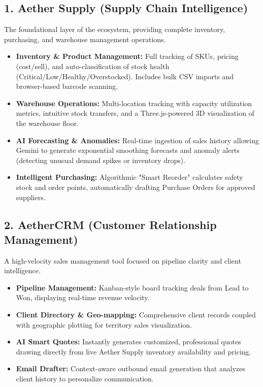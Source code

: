\documentclass[12pt,a4paper]{article}
\begin{document}
\subsection{1. Aether Supply (Supply Chain Intelligence)}
The foundational layer of the ecosystem, providing complete inventory, purchasing, and warehouse management operations.
\begin{itemize}[label=\textcolor{AetherLavender}{\textbullet}]
    \item \textbf{Inventory & Product Management:} Full tracking of SKUs, pricing (cost/sell), and auto-classification of stock health (Critical/Low/Healthy/Overstocked). Includes bulk CSV imports and browser-based barcode scanning.
    \item \textbf{Warehouse Operations:} Multi-location tracking with capacity utilization metrics, intuitive stock transfers, and a Three.js-powered 3D visualization of the warehouse floor.
    \item \textbf{AI Forecasting & Anomalies:} Real-time ingestion of sales history allowing Gemini to generate exponential smoothing forecasts and anomaly alerts (detecting unusual demand spikes or inventory drops).
    \item \textbf{Intelligent Purchasing:} Algorithmic "Smart Reorder" calculates safety stock and order points, automatically drafting Purchase Orders for approved suppliers.
\end{itemize}

\subsection{2. AetherCRM (Customer Relationship Management)}
A high-velocity sales management tool focused on pipeline clarity and client intelligence.
\begin{itemize}[label=\textcolor{AetherLavender}{\textbullet}]
    \item \textbf{Pipeline Management:} Kanban-style board tracking deals from Lead to Won, displaying real-time revenue velocity.
    \item \textbf{Client Directory & Geo-mapping:} Comprehensive client records coupled with geographic plotting for territory sales visualization.
    \item \textbf{AI Smart Quotes:} Instantly generates customized, professional quotes drawing directly from live Aether Supply inventory availability and pricing.
    \item \textbf{Email Drafter:} Context-aware outbound email generation that analyzes client history to personalize communication.
\end{itemize}
\end{document}
